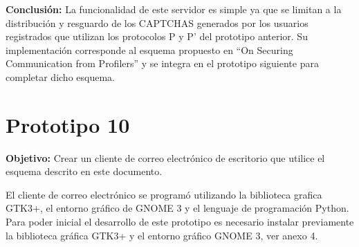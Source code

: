 \textbf{Conclusión:} La funcionalidad de este servidor es simple ya que se limitan a la distribución y resguardo de los CAPTCHAS generados por los usuarios registrados que utilizan los protocolos P y P’ del prototipo anterior. Su implementación corresponde al esquema propuesto en “On Securing  Communication  from Profilers” y se integra en el prototipo siguiente para completar dicho esquema.
\pagebreak
\section{Prototipo 10}

\textbf{Objetivo:} Crear un cliente de correo electrónico de escritorio que utilice el esquema descrito en este documento.

El cliente de correo electrónico se programó utilizando la biblioteca grafica GTK3+, el entorno gráfico de GNOME 3 y el lenguaje de programación Python. Para poder inicial el desarrollo de este prototipo es necesario instalar previamente la biblioteca gráfica GTK3+ y el entorno gráfico GNOME 3, ver anexo 4. 

